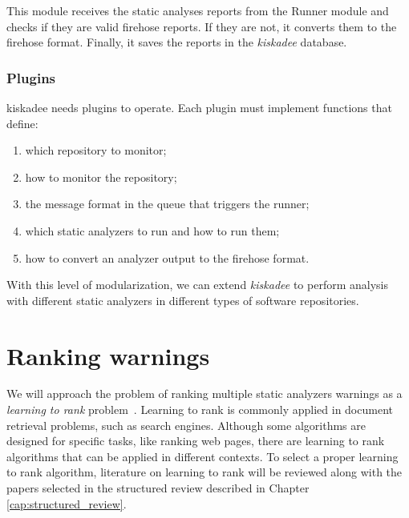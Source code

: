 This module receives the static analyses reports from the Runner module and
checks if they are valid firehose reports. If they are not, it converts them to
the firehose format. Finally, it saves the reports in the \textit{kiskadee}
database.

\subsubsection{Plugins}

kiskadee needs plugins to operate. Each plugin must implement
functions that define:

\begin{enumerate}
  \item which repository to monitor;
  \item how to monitor the repository;
  \item the message format in the queue that triggers the runner;
  \item which static analyzers to run and how to run them;
  \item how to convert an analyzer output to the firehose format.
\end{enumerate}

With this level of modularization, we can extend \textit{kiskadee} to perform
analysis with different static analyzers in different types of software
repositories.

\section{Ranking warnings}
\label{sec:ranking_warnings}

We will approach the problem of ranking multiple static analyzers warnings as a
\textit{learning to rank} problem~\cite{liu2009learning}. Learning to rank is
commonly applied in document retrieval problems, such as search engines.
Although some algorithms are designed for specific tasks, like ranking web
pages, there are learning to rank algorithms that can be applied in different
contexts. To select a proper learning to rank algorithm, literature on learning
to rank will be reviewed along with the papers selected in the structured
review described in Chapter \ref{cap:structured_review}.

